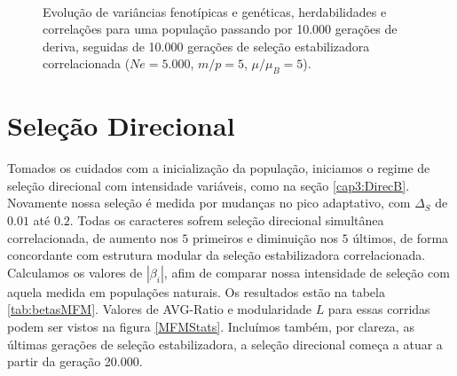 \begin{figure}[htbp]
   \\
   \caption{Evolução de variâncias fenotípicas e genéticas,
   herdabilidades e correlações para uma população passando por 10.000
gerações de deriva, seguidas de 10.000 gerações de seleção
estabilizadora correlacionada ($Ne = 5.000$, $m/p=5$, $\mu/\mu_B=5$).}
   \label{varBurnin}
\end{figure}


\section{Seleção Direcional}

Tomados os cuidados com a inicialização da população, iniciamos o
regime de seleção direcional com intensidade variáveis, como na seção
\ref{cap3:DirecB}. 
Novamente nossa seleção é medida por mudanças no pico adaptativo, com
$\Delta_S$ de $0.01$ até $0.2$. 
Todas os caracteres sofrem seleção direcional simultânea correlacionada,
de aumento nos $5$ primeiros e diminuição nos $5$ últimos, de forma
concordante com estrutura modular da seleção estabilizadora
correlacionada.
Calculamos os valores de $|\beta_i|$, afim de comparar nossa
intensidade de seleção com aquela medida em populações naturais.
Os resultados estão na tabela \ref{tab:betasMFM}.
Valores de AVG-Ratio e modularidade $L$ para essas corridas podem ser
vistos na figura \ref{MFMStats}. 
Incluímos também, por clareza, as últimas gerações de seleção
estabilizadora, a seleção direcional começa a atuar a partir da geração
20.000. 

